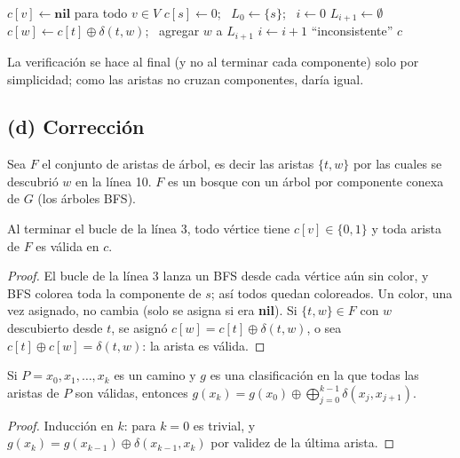 \begin{algorithm}[H]
\caption{Consistencia de los juicios (caso general)}
\begin{algorithmic}[1]
  \State $c[v]\gets\textbf{nil}$ para todo $v\in V$
   
    \State $c[s]\gets0$; \ $L_0\gets\{s\}$; \ $i\gets0$
      \State $L_{i+1}\gets\emptyset$
            \State $c[w]\gets c[t]\oplus\delta(t,w)$; \ agregar $w$ a $L_{i+1}$
          \EndIf
        \EndFor
      \EndFor
      \State $i\gets i+1$
    \EndWhile
  \EndFor
     \State \Return ``inconsistente'' \EndIf
  \EndFor
  \State \Return $c$
\EndFunction
\end{algorithmic}
\end{algorithm}
La verificación se hace al final (y no al terminar cada componente) solo por simplicidad; como las
aristas no cruzan componentes, daría igual.

\subsection*{(d) Corrección}
Sea $F$ el conjunto de aristas de árbol, es decir las aristas $\{t,w\}$ por las cuales se descubrió $w$
en la línea 10. $F$ es un bosque con un árbol por componente conexa de $G$ (los árboles BFS).

\begin{lema}\label{l:arbol-valido}
Al terminar el bucle de la línea 3, todo vértice tiene $c[v]\in\{0,1\}$ y toda arista de $F$ es válida
en $c$.
\end{lema}
\begin{proof}
El bucle de la línea 3 lanza un BFS desde cada vértice aún sin color, y BFS colorea toda la componente
de $s$; así todos quedan coloreados. Un color, una vez asignado, no cambia (solo se asigna si era
\textbf{nil}). Si $\{t,w\}\in F$ con $w$ descubierto desde $t$, se asignó $c[w]=c[t]\oplus\delta(t,w)$,
o sea $c[t]\oplus c[w]=\delta(t,w)$: la arista es válida.
\end{proof}

\begin{lema}\label{l:camino}
Si $P=x_0,x_1,\dots,x_k$ es un camino y $g$ es una clasificación en la que todas las aristas de $P$
son válidas, entonces $g(x_k)=g(x_0)\oplus\bigoplus_{j=0}^{k-1}\delta(x_j,x_{j+1})$.
\end{lema}
\begin{proof}
Inducción en $k$: para $k=0$ es trivial, y $g(x_{k})=g(x_{k-1})\oplus\delta(x_{k-1},x_k)$ por validez de
la última arista.
\end{proof}

